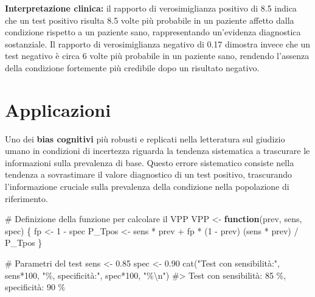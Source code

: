 \documentclass[
  letterpaper,
  DIV=11,
  numbers=noendperiod,
  oneside]{scrreprt}
\newenvironment{Shaded}{\begin{snugshade}}{\end{snugshade}}
\newcommand{\CommentTok}[1]{\textcolor[rgb]{0.37,0.37,0.37}{#1}}
\newcommand{\ControlFlowTok}[1]{\textcolor[rgb]{0.00,0.23,0.31}{\textbf{#1}}}
\newcommand{\DecValTok}[1]{\textcolor[rgb]{0.68,0.00,0.00}{#1}}
\newcommand{\FloatTok}[1]{\textcolor[rgb]{0.68,0.00,0.00}{#1}}
\newcommand{\FunctionTok}[1]{\textcolor[rgb]{0.28,0.35,0.67}{#1}}
\newcommand{\NormalTok}[1]{\textcolor[rgb]{0.00,0.23,0.31}{#1}}
\newcommand{\OtherTok}[1]{\textcolor[rgb]{0.00,0.23,0.31}{#1}}
\newcommand{\SpecialCharTok}[1]{\textcolor[rgb]{0.37,0.37,0.37}{#1}}
\newcommand{\StringTok}[1]{\textcolor[rgb]{0.13,0.47,0.30}{#1}}
\theoremstyle{definition}
\theoremstyle{plain}
\theoremstyle{definition}
\theoremstyle{remark}
\begin{document}
\textbf{Interpretazione clinica:} il rapporto di verosimiglianza
positivo di 8.5 indica che un test positivo risulta 8.5 volte più
probabile in un paziente affetto dalla condizione rispetto a un paziente
sano, rappresentando un'evidenza diagnostica sostanziale. Il rapporto di
verosimiglianza negativo di 0.17 dimostra invece che un test negativo è
circa 6 volte più probabile in un paziente sano, rendendo l'assenza
della condizione fortemente più credibile dopo un risultato negativo.

\section{Applicazioni}\label{applicazioni}

\begin{tcolorbox}[enhanced jigsaw, arc=.35mm, breakable, colbacktitle=quarto-callout-note-color!10!white, opacityback=0, toprule=.15mm, rightrule=.15mm, colback=white, opacitybacktitle=0.6, leftrule=.75mm, coltitle=black, bottomtitle=1mm, left=2mm, toptitle=1mm, title=\textcolor{quarto-callout-note-color}{\faInfo}\hspace{0.5em}{La fallacia del tasso base}, titlerule=0mm, bottomrule=.15mm, colframe=quarto-callout-note-color-frame]

Uno dei \textbf{bias cognitivi} più robusti e replicati nella
letteratura sul giudizio umano in condizioni di incertezza riguarda la
tendenza sistematica a trascurare le informazioni sulla prevalenza di
base. Questo errore sistematico consiste nella tendenza a sovrastimare
il valore diagnostico di un test positivo, trascurando l'informazione
cruciale sulla prevalenza della condizione nella popolazione di
riferimento.

\begin{Shaded}
\begin{Highlighting}[]
\CommentTok{\# Definizione della funzione per calcolare il VPP}
\NormalTok{VPP }\OtherTok{\textless{}{-}} \ControlFlowTok{function}\NormalTok{(prev, sens, spec) \{}
\NormalTok{  fp }\OtherTok{\textless{}{-}} \DecValTok{1} \SpecialCharTok{{-}}\NormalTok{ spec}
\NormalTok{  P\_Tpos }\OtherTok{\textless{}{-}}\NormalTok{ sens }\SpecialCharTok{*}\NormalTok{ prev }\SpecialCharTok{+}\NormalTok{ fp }\SpecialCharTok{*}\NormalTok{ (}\DecValTok{1} \SpecialCharTok{{-}}\NormalTok{ prev)}
\NormalTok{  (sens }\SpecialCharTok{*}\NormalTok{ prev) }\SpecialCharTok{/}\NormalTok{ P\_Tpos}
\NormalTok{\}}

\CommentTok{\# Parametri del test}
\NormalTok{sens }\OtherTok{\textless{}{-}} \FloatTok{0.85}
\NormalTok{spec }\OtherTok{\textless{}{-}} \FloatTok{0.90}
\FunctionTok{cat}\NormalTok{(}\StringTok{"Test con sensibilità:"}\NormalTok{, sens}\SpecialCharTok{*}\DecValTok{100}\NormalTok{, }\StringTok{"\%, specificità:"}\NormalTok{, spec}\SpecialCharTok{*}\DecValTok{100}\NormalTok{, }\StringTok{"\%}\SpecialCharTok{\textbackslash{}n}\StringTok{"}\NormalTok{)}
\CommentTok{\#\textgreater{} Test con sensibilità: 85 \%, specificità: 90 \%}
\end{Highlighting}
\end{Shaded}


\end{tcolorbox}
\end{document}
